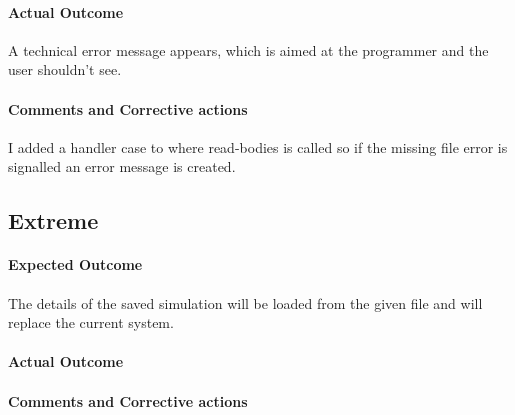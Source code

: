 \paragraph{Actual Outcome}
A technical error message appears, which is aimed at the programmer and the user
shouldn't see.
\paragraph{Comments and Corrective actions}
I added a handler case to where read-bodies is called so if the missing file
error is signalled an error message is created.

\subsection{Extreme}
\paragraph{Expected Outcome}
The details of the saved simulation will be loaded from the given file and will
replace the current system.
\paragraph{Actual Outcome}
\paragraph{Comments and Corrective actions}

